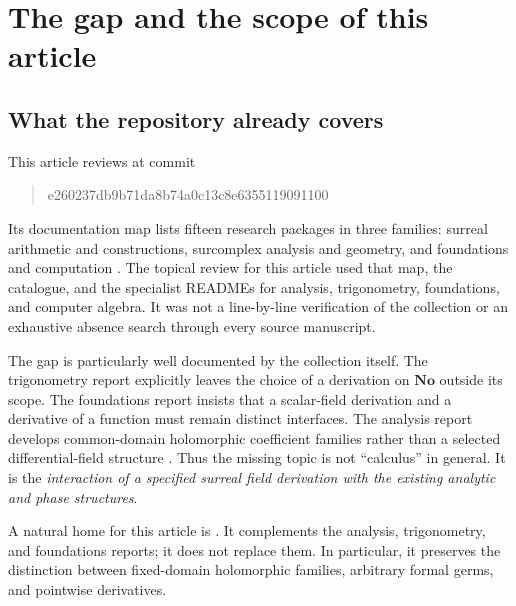 \documentclass[11pt,a4paper]{article}
\theoremstyle{definition}
\newcommand{\No}{\mathbf{No}}
\numberwithin{equation}{section}
\begin{document}
\hypersetup{pageanchor=true}
\tableofcontents
\clearpage
{}

\section{The gap and the scope of this article}\label{sec:gap}

\subsection{What the repository already covers}
This article reviews  at commit
\begin{quote}\small\ttfamily
e260237db9b71da8b74a0c13c8e6355119091100
\end{quote}
Its documentation map lists fifteen
research packages in three families: surreal arithmetic and constructions,
surcomplex analysis and geometry, and foundations and computation
\cite{RepoMap}. The topical review for this article used that map, the
catalogue, and the specialist READMEs for analysis, trigonometry,
foundations, and computer algebra. It was not a line-by-line verification
of the collection or an exhaustive absence search through every source
manuscript.

The gap is particularly well documented by the collection itself. The
trigonometry report explicitly leaves the choice of a derivation on $\No$
outside its scope. The foundations report insists that a scalar-field
derivation and a derivative of a function must remain distinct interfaces.
The analysis report develops common-domain holomorphic coefficient
families rather than a selected differential-field structure
\cite{RepoTrig,RepoFound,RepoAnalysis}. Thus the missing topic is not
``calculus'' in general. It is the \emph{interaction of a specified surreal
field derivation with the existing analytic and phase structures}.

A natural home for this article is
. It complements the analysis,
trigonometry, and foundations reports; it does not replace them. In
particular, it preserves the distinction between fixed-domain holomorphic
families, arbitrary formal germs, and pointwise derivatives.
\end{document}
